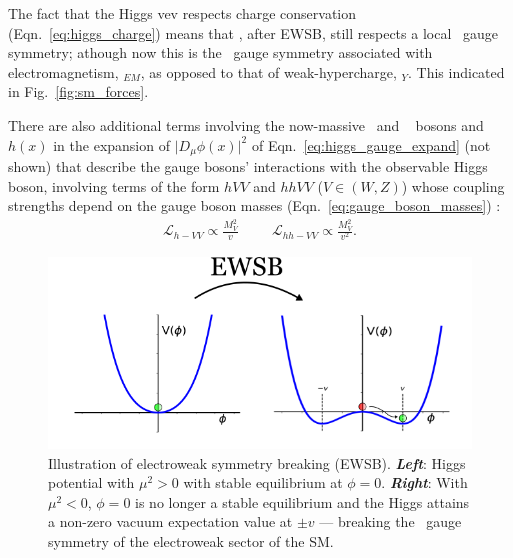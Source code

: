 The fact that the Higgs vev respects charge conservation (Eqn.~\ref{eq:higgs_charge}) means
that \SML, after EWSB, still respects a local \Uone~gauge symmetry; athough now
this is the \Uone~gauge symmetry associated with electromagnetism, \Uone$_{EM}$,
as opposed to that of weak-hypercharge, \Uone$_Y$. This indicated in Fig.~\ref{fig:sm_forces}.

There are also additional terms involving the now-massive \fieldWpm~and \fieldZ~ bosons and $h(x)$ in the expansion of $\lvert D_{\mu}\phi(x)\rvert^2$ of
Eqn.~\ref{eq:higgs_gauge_expand} (not shown) that describe the gauge bosons' interactions with the observable Higgs boson,
involving terms of the form $hVV$ and $hhVV$ ($V\in(W,Z)$) whose coupling strengths depend
on the gauge boson masses (Eqn.~\ref{eq:gauge_boson_masses}) {\color{red}{feynman diagrams?}}:
\begin{align}
	\mathcal{L}_{h-VV} \propto \frac{M_V^2}{v} \hspace{1cm} \mathcal{L}_{hh-VV} \propto \frac{M_V^2}{v^2}.
	\label{eq:higgs_gauge_couplings}
\end{align}
\begin{figure}[!htb]
	\begin{center}
		\includegraphics[width=\textwidth]{figures/chapter1/higgs_potential_trans}
		\caption{Illustration of electroweak symmetry breaking (EWSB).
			\textbf{\textit{Left}}: Higgs potential with $\mu^2>0$ with stable equilibrium at $\phi=0$.
			\textbf{\textit{Right}}: With $\mu^2<0$, $\phi=0$ is no longer
			a stable equilibrium and the Higgs attains a non-zero vacuum
			expectation value at $\pm v$ --- breaking the \SUewk~gauge symmetry of the electroweak
			sector of the SM.
		}
	\label{fig:higgs_ewsb}
	\end{center}
\end{figure}

